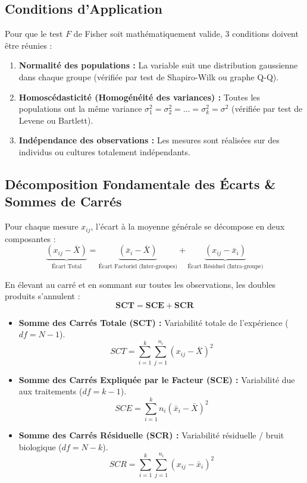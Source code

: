 \documentclass[11pt,a4paper]{article}
\begin{document}
\subsection{Conditions d'Application}
Pour que le test $F$ de Fisher soit mathématiquement valide, 3 conditions doivent être réunies :
\begin{enumerate}[leftmargin=*, label=\textbf{\arabic*.}]
  \item \textbf{Normalité des populations :} La variable suit une distribution gaussienne dans chaque groupe (vérifiée par test de Shapiro-Wilk ou graphe Q-Q).
  \item \textbf{Homoscédasticité (Homogénéité des variances) :} Toutes les populations ont la même variance $\sigma_1^2 = \sigma_2^2 = \dots = \sigma_k^2 = \sigma^2$ (vérifiée par test de Levene ou Bartlett).
  \item \textbf{Indépendance des observations :} Les mesures sont réalisées sur des individus ou cultures totalement indépendants.
\end{enumerate}

\subsection{Décomposition Fondamentale des Écarts \& Sommes de Carrés}
Pour chaque mesure $x_{ij}$, l'écart à la moyenne générale se décompose en deux composantes :
\begin{equation*}
\underbrace{(x_{ij} - \bar{X})}_{\text{Écart Total}} = \underbrace{(\bar{x}_i - \bar{X})}_{\text{Écart Factoriel (Inter-groupes)}} + \underbrace{(x_{ij} - \bar{x}_i)}_{\text{Écart Résiduel (Intra-groupe)}}
\end{equation*}

En élevant au carré et en sommant sur toutes les observations, les doubles produits s'annulent :
\begin{equation*}
\mathbf{SCT = SCE + SCR}
\end{equation*}

\begin{itemize}[leftmargin=*, label=\faCircle]
  \item \textbf{Somme des Carrés Totale (SCT) :} Variabilité totale de l'expérience ($df = N - 1$).
  \begin{equation*}
    SCT = \sum_{i=1}^k \sum_{j=1}^{n_i} (x_{ij} - \bar{X})^2
  \end{equation*}
  \item \textbf{Somme des Carrés Expliquée par le Facteur (SCE) :} Variabilité due aux traitements ($df = k - 1$).
  \begin{equation*}
    SCE = \sum_{i=1}^k n_i (\bar{x}_i - \bar{X})^2
  \end{equation*}
  \item \textbf{Somme des Carrés Résiduelle (SCR) :} Variabilité résiduelle / bruit biologique ($df = N - k$).
  \begin{equation*}
    SCR = \sum_{i=1}^k \sum_{j=1}^{n_i} (x_{ij} - \bar{x}_i)^2
  \end{equation*}
\end{itemize}
\end{document}
